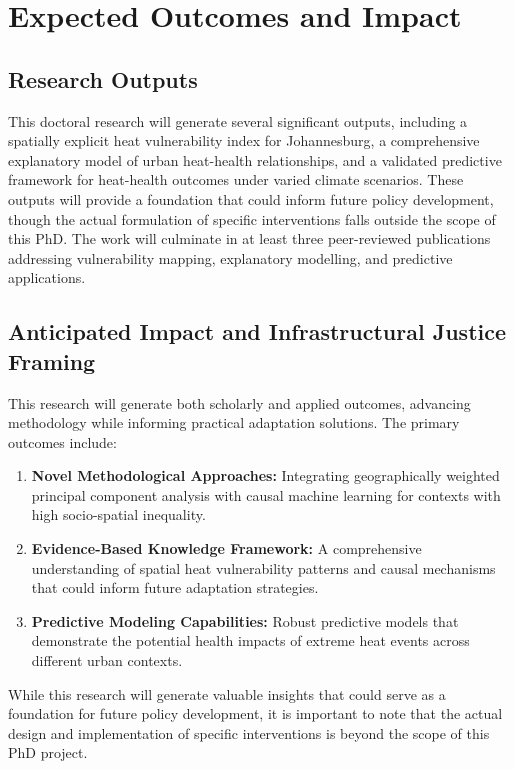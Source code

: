 \section{Expected Outcomes and Impact}

\subsection{Research Outputs}
This doctoral research will generate several significant outputs, including a spatially explicit heat vulnerability index for Johannesburg, a comprehensive explanatory model of urban heat-health relationships, and a validated predictive framework for heat-health outcomes under varied climate scenarios. These outputs will provide a foundation that could inform future policy development, though the actual formulation of specific interventions falls outside the scope of this PhD. The work will culminate in at least three peer-reviewed publications addressing vulnerability mapping, explanatory modelling, and predictive applications.

\subsection{Anticipated Impact and Infrastructural Justice Framing}
This research will generate both scholarly and applied outcomes, advancing methodology while informing practical adaptation solutions. The primary outcomes include:

\begin{enumerate}
    \item \textbf{Novel Methodological Approaches:} Integrating geographically weighted principal component analysis with causal machine learning for contexts with high socio-spatial inequality.
    
    \item \textbf{Evidence-Based Knowledge Framework:} A comprehensive understanding of spatial heat vulnerability patterns and causal mechanisms that could inform future adaptation strategies.
    
    \item \textbf{Predictive Modeling Capabilities:} Robust predictive models that demonstrate the potential health impacts of extreme heat events across different urban contexts.
\end{enumerate}

While this research will generate valuable insights that could serve as a foundation for future policy development, it is important to note that the actual design and implementation of specific interventions is beyond the scope of this PhD project.

